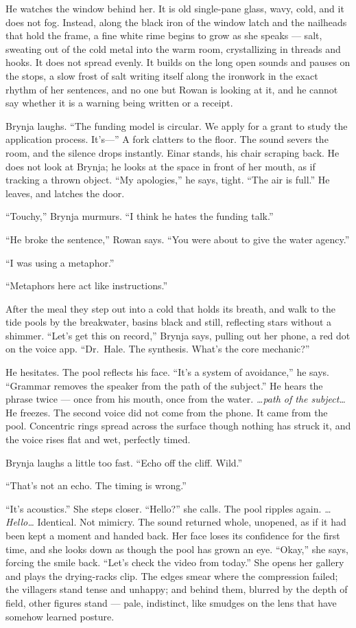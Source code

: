 \documentclass[11pt,oneside]{book}
\begin{document}
He watches the window behind her. It is old single-pane glass, wavy,
cold, and it does not fog. Instead, along the black iron of the window
latch and the nailheads that hold the frame, a fine white rime begins to
grow as she speaks --- salt, sweating out of the cold metal into the
warm room, crystallizing in threads and hooks. It does not spread
evenly. It builds on the long open sounds and pauses on the stops, a
slow frost of salt writing itself along the ironwork in the exact rhythm
of her sentences, and no one but Rowan is looking at it, and he cannot
say whether it is a warning being written or a receipt.

Brynja laughs. ``The funding model is circular. We apply for a grant to
study the application process. It's---'' A fork clatters to the floor.
The sound severs the room, and the silence drops instantly. Einar
stands, his chair scraping back. He does not look at Brynja; he looks at
the space in front of her mouth, as if tracking a thrown object. ``My
apologies,'' he says, tight. ``The air is full.'' He leaves, and latches
the door.

``Touchy,'' Brynja murmurs. ``I think he hates the funding talk.''

``He broke the sentence,'' Rowan says. ``You were about to give the
water agency.''

``I was using a metaphor.''

``Metaphors here act like instructions.''

After the meal they step out into a cold that holds its breath, and walk
to the tide pools by the breakwater, basins black and still, reflecting
stars without a shimmer. ``Let's get this on record,'' Brynja says,
pulling out her phone, a red dot on the voice app. ``Dr.~Hale. The
synthesis. What's the core mechanic?''

He hesitates. The pool reflects his face. ``It's a system of
avoidance,'' he says. ``Grammar removes the speaker from the path of the
subject.'' He hears the phrase twice --- once from his mouth, once from
the water. \emph{\ldots path of the subject\ldots{}} He freezes. The
second voice did not come from the phone. It came from the pool.
Concentric rings spread across the surface though nothing has struck it,
and the voice rises flat and wet, perfectly timed.

Brynja laughs a little too fast. ``Echo off the cliff. Wild.''

``That's not an echo. The timing is wrong.''

``It's acoustics.'' She steps closer. ``Hello?'' she calls. The pool
ripples again. \emph{\ldots Hello\ldots{}} Identical. Not mimicry. The
sound returned whole, unopened, as if it had been kept a moment and
handed back. Her face loses its confidence for the first time, and she
looks down as though the pool has grown an eye. ``Okay,'' she says,
forcing the smile back. ``Let's check the video from today.'' She opens
her gallery and plays the drying-racks clip. The edges smear where the
compression failed; the villagers stand tense and unhappy; and behind
them, blurred by the depth of field, other figures stand --- pale,
indistinct, like smudges on the lens that have somehow learned posture.
\end{document}
